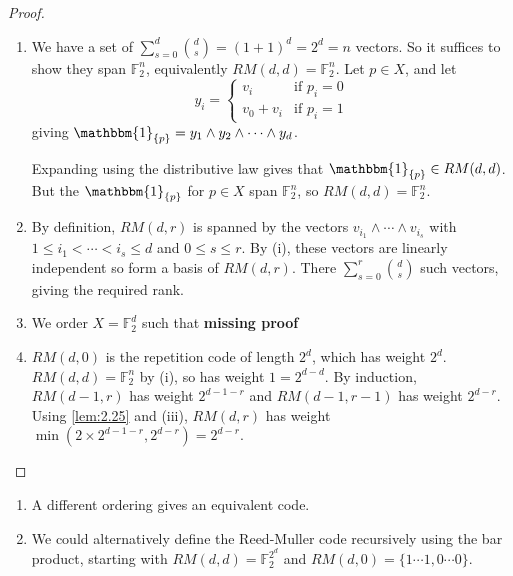 \documentclass{article}
\newcommand{\F}{\mathbb{F}}
\newcommand{\1}[1]{\mathbbm{1}_{#1}}
\begin{document}
\begin{proof}
    \leavevmode
    \begin{enumerate}[label=(\roman*)]
        \item We have a set of $\sum_{s=0}^d \binom{d}{s} = (1+1)^d = 2^d = n$ vectors.
            So it suffices to show they span $\F_2^n$, equivalently $RM(d, d) = \F_2^n$.
            Let $p \in X$, and let
            \begin{equation*}
                y_i =
                \begin{cases}
                    v_i & \text{if } p_i = 0 \\
                    v_0 + v_i & \text{if } p_i = 1
                \end{cases}
            \end{equation*}
            giving $\1{\{p\}} = y_1 \wedge y_2 \wedge \dotsb \wedge y_d$.

            Expanding using the distributive law gives that $\1{\{p\}} \in RM(d, d)$.
            But the $\1{\{p\}}$ for $p \in X$ span $\F_2^n$, so $RM(d, d) = \F_2^n$.
        \item By definition, $RM(d, r)$ is spanned by the vectors $v_{i_1} \wedge \dotsb \wedge v_{i_s}$ with $1 \leq i_1 < \dotsb < i_s \leq d$ and $0 \leq s \leq r$.
            By (i), these vectors are linearly independent so form a basis of $RM(d, r)$.
            There $\sum_{s=0}^r \binom{d}{s}$ such vectors, giving the required rank.
        \item We order $X = \F_2^d$ such that
            \textbf{missing proof}
        \item $RM(d, 0)$ is the repetition code of length $2^d$, which has weight $2^d$. $RM(d, d) = \F_2^n$ by (i), so has weight $1 = 2^{d-d}$.
            By induction, $RM(d-1, r)$ has weight $2^{d-1-r}$ and $RM(d-1, r-1)$ has weight $2^{d-r}$.
            Using \cref{lem:2.25} and (iii), $RM(d, r)$ has weight $\min(2 \times 2^{d-1-r}, 2^{d-r}) = 2^{d-r}$.
    \end{enumerate}
\end{proof}
\begin{remark}\leavevmode
    \begin{enumerate}[label=(\arabic*)]
        \item A different ordering gives an equivalent code.
        \item We could alternatively define the Reed-Muller code recursively using the bar product, starting with $RM(d, d) = \F_2^{2^d}$ and $RM(d, 0)=\{1\dotsm1, 0\dotsm0\}$.
    \end{enumerate}
\end{remark}
\end{document}
